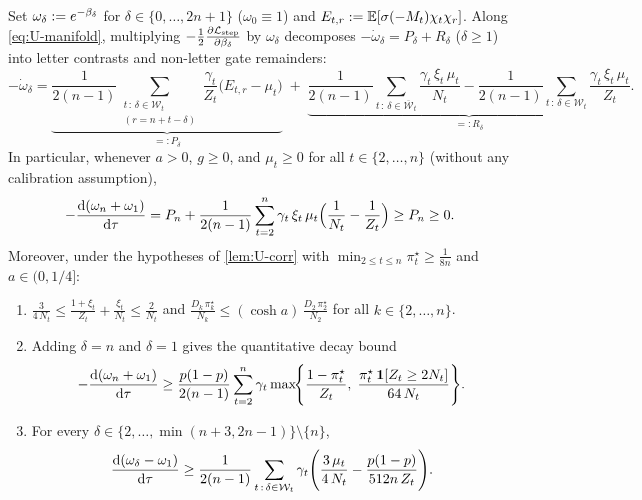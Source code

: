 \begin{lemma}
\label{lem:U-lag-cancel}
Set $\omega_\delta := e^{-\beta_\delta}$ for $\delta \in \{0,\ldots,2n+1\}$ ($\omega_0 \equiv 1$) and $E_{t,r} := \mathbb E[\sigma(-M_t)\chi_t\chi_r]$. Along \cref{eq:U-manifold}, multiplying $-\frac{1}{2}\pd{\Lstep}{\brel_\delta}$ by $\omega_\delta$ decomposes $-\dot\omega_\delta = P_\delta + R_\delta$ ($\delta \ge 1$) into letter contrasts and non-letter gate remainders:
\begin{equation}
 -\dot\omega_\delta = \underbrace{\frac{1}{2(n-1)}\sum_{\substack{t\,:\,\delta\in\mathcal W_t\\(r = n+t-\delta)}}\frac{\gamma_t}{Z_t}\bigl(E_{t,r} - \mu_t\bigr)}_{=: P_\delta}
 \;+\;
 \underbrace{\frac{1}{2(n-1)}\sum_{t\,:\,\delta\in\overline{\mathcal W}_t}\frac{\gamma_t\,\xi_t\,\mu_t}{N_t} - \frac{1}{2(n-1)}\sum_{t\,:\,\delta\in\mathcal W_t}\frac{\gamma_t\,\xi_t\,\mu_t}{Z_t}}_{=: R_\delta}.
 \label{eq:U-wd-ode}
\end{equation}
In particular, whenever $a > 0$, $g \ge 0$, and $\mu_t \ge 0$ for all $t \in \{2,\ldots,n\}$ (without any calibration assumption),
\begin{equation}
 -\ddtau{(\omega_n + \omega_1)} = P_n + \frac{1}{2(n-1)}\sum_{t=2}^n \gamma_t\,\xi_t\,\mu_t\Bigl(\frac{1}{N_t} - \frac{1}{Z_t}\Bigr) \ge P_n \ge 0.
 \label{eq:U-post-wnw1}
\end{equation}
Moreover, under the hypotheses of \cref{lem:U-corr} with $\min_{2\le t\le n}\pi_t^\star \ge \frac{1}{8n}$ and $a \in (0, 1/4]$:
\begin{enumerate}[label=(\roman*),leftmargin=*]
\item $\frac{3}{4\,N_t} \le \frac{1 + \xi_t}{Z_t} + \frac{\xi_t}{N_t} \le \frac{2}{N_t}$ and $\frac{D_k\,\pi_k^\star}{N_k} \le (\cosh a)\,\frac{D_2\,\pi_2^\star}{N_2}$ for all $k \in \{2,\ldots,n\}$.
\item Adding $\delta = n$ and $\delta = 1$ gives the quantitative decay bound
\begin{equation}
 -\ddtau{(\omega_n + \omega_1)} \ge \frac{p(1-p)}{2(n-1)}\sum_{t=2}^n \gamma_t\max\!\Biggl\{\frac{1 - \pi_t^\star}{Z_t},\; \frac{\pi_t^\star\,\one[Z_t \ge 2N_t]}{64\,N_t}\Biggr\}.
 \label{eq:U-wn-w1}
\end{equation}
\item For every $\delta \in \{2,\ldots,\min(n+3, 2n-1)\}\setminus\{n\}$,
\begin{equation}
 \ddtau{(\omega_\delta - \omega_1)} \ge \frac{1}{2(n-1)}\sum_{t\,:\,\delta\in\mathcal W_t} \gamma_t\Biggl(\frac{3\,\mu_t}{4\,N_t} - \frac{p(1-p)}{512n\,Z_t}\Biggr).
 \label{eq:U-wdelta-w1}
\end{equation}
\end{enumerate}
\end{lemma}
